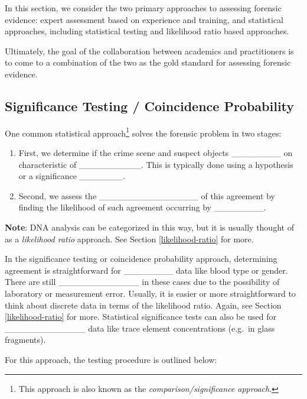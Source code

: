 \documentclass[]{book}
\providecommand{\tightlist}{%
  \setlength{\itemsep}{0pt}\setlength{\parskip}{0pt}}
\let\rmarkdownfootnote\footnote%
\def\footnote{\protect\rmarkdownfootnote}
\theoremstyle{definition}
\theoremstyle{definition}
\theoremstyle{remark}
\begin{document}
In this section, we consider the two primary approaches to assessing
forensic evidence: expert assessment based on experience and training,
and statistical approaches, including statistical testing and likelihood
ratio based approaches.

Ultimately, the goal of the collaboration between academics and
practitioners is to come to a combination of the two as the gold
standard for assessing forensic evidence.

\subsection{Significance Testing / Coincidence
Probability}\label{significance-testing-coincidence-probability}

One common statistical approach\footnote{This approach is also known as
  the \emph{comparison/significance approach}.} solves the forensic
problem in two stages:

\begin{enumerate}
\def\labelenumi{\arabic{enumi}.}
\tightlist
\item
  First, we determine if the crime scene and suspect objects
  \_\_\_\_\_\_\_\_ on characteristic of \_\_\_\_\_\_\_\_\_\_. This is
  typically done using a hypothesis or a significance \_\_\_\_\_\_\_.
  \vspace{.1in}
\item
  Second, we assess the \_\_\_\_\_\_\_\_\_\_\_\_\_\_\_\_ of this
  agreement by finding the likelihood of such agreement occurring by
  \_\_\_\_\_\_\_\_.
\end{enumerate}

\textbf{Note}: DNA analysis can be categorized in this way, but it is
usually thought of as a \emph{likelihood ratio} approach. See Section
\ref{likelihood-ratio} for more.

In the significance testing or coincidence probability approach,
determining agreement is straightforward for \_\_\_\_\_\_\_\_ data like
blood type or gender. There are still \_\_\_\_\_\_\_\_\_\_\_\_\_ in
these cases due to the possibility of laboratory or measurement error.
Usually, it is easier or more straightforward to think about discrete
data in terms of the likelihood ratio. Again, see Section
\ref{likelihood-ratio} for more. Statistical significance tests can also
be used for \_\_\_\_\_\_\_\_\_\_\_\_\_ data like trace element
concentrations (e.g.~in glass fragments).

For this approach, the testing procedure is outlined below:
\vspace{.1in}
\end{document}
